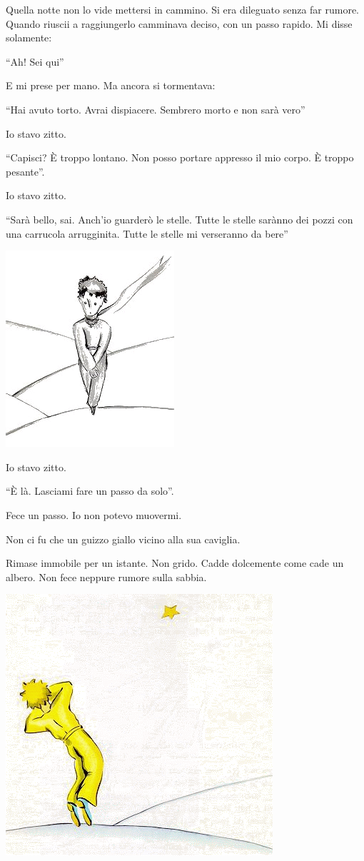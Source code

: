 \documentclass[11pt]{scrbook}
\begin{document}
Quella notte non lo vide mettersi in cammino. Si era dileguato senza far rumore. Quando riuscii a raggiungerlo camminava deciso, con un passo rapido. Mi disse solamente:

``Ah! Sei qui''

E mi prese per mano. Ma ancora si tormentava:

``Hai avuto torto. Avrai dispiacere. Sembrero morto e non sarà vero''

Io stavo zitto.

``Capisci? È troppo lontano. Non posso portare appresso il mio corpo. È troppo pesante''.

Io stavo zitto.

``Sarà bello, sai. Anch'io guarderò le stelle. Tutte le stelle sarànno dei pozzi con una carrucola arrugginita. Tutte le stelle mi verseranno da bere''

\begin{center}
\includegraphics{img/26c}
\end{center}

Io stavo zitto.

``È là. Lasciami fare un passo da solo''.

Fece un passo. Io non potevo muovermi.

Non ci fu che un guizzo giallo vicino alla sua caviglia.

Rimase immobile per un istante. Non grido. Cadde dolcemente come cade un albero. Non fece neppure rumore sulla sabbia.

\begin{center}
\includegraphics{img/zlaty}
\end{center}
\end{document}
